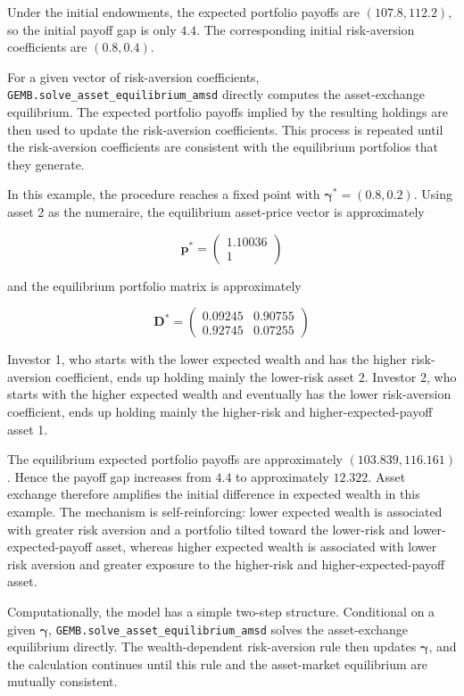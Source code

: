 \documentclass[
  letterpaper,
  DIV=11,
  numbers=noendperiod]{scrreprt}
\begin{document}
Under the initial endowments, the expected portfolio payoffs are
\((107.8,112.2)\), so the initial payoff gap is only \(4.4\). The
corresponding initial risk-aversion coefficients are \((0.8,0.4)\).

For a given vector of risk-aversion coefficients,
\texttt{GEMB.solve\_asset\_equilibrium\_amsd} directly computes the
asset-exchange equilibrium. The expected portfolio payoffs implied by
the resulting holdings are then used to update the risk-aversion
coefficients. This process is repeated until the risk-aversion
coefficients are consistent with the equilibrium portfolios that they
generate.

In this example, the procedure reaches a fixed point with
\(\boldsymbol{\gamma}^*=(0.8,0.2)\). Using asset 2 as the numeraire, the
equilibrium asset-price vector is approximately

\[
\mathbf p^*
=
\begin{pmatrix}
1.10036\\
1
\end{pmatrix}
\]

and the equilibrium portfolio matrix is approximately

\[
\mathbf D^*
=
\begin{pmatrix}
0.09245&0.90755\\
0.92745&0.07255
\end{pmatrix}
\]

Investor 1, who starts with the lower expected wealth and has the higher
risk-aversion coefficient, ends up holding mainly the lower-risk asset
2. Investor 2, who starts with the higher expected wealth and eventually
has the lower risk-aversion coefficient, ends up holding mainly the
higher-risk and higher-expected-payoff asset 1.

The equilibrium expected portfolio payoffs are approximately
\((103.839,116.161)\). Hence the payoff gap increases from \(4.4\) to
approximately \(12.322\). Asset exchange therefore amplifies the initial
difference in expected wealth in this example. The mechanism is
self-reinforcing: lower expected wealth is associated with greater risk
aversion and a portfolio tilted toward the lower-risk and
lower-expected-payoff asset, whereas higher expected wealth is
associated with lower risk aversion and greater exposure to the
higher-risk and higher-expected-payoff asset.

Computationally, the model has a simple two-step structure. Conditional
on a given \(\boldsymbol{\gamma}\),
\texttt{GEMB.solve\_asset\_equilibrium\_amsd} solves the asset-exchange
equilibrium directly. The wealth-dependent risk-aversion rule then
updates \(\boldsymbol{\gamma}\), and the calculation continues until
this rule and the asset-market equilibrium are mutually consistent.
\end{document}
